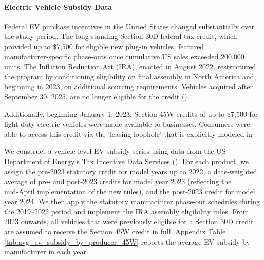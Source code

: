 \documentclass[11pt]{article}
\begin{document}
\paragraph{Electric Vehicle Subsidy Data}
Federal EV purchase incentives in the United States changed substantially over the study period. The long‑standing Section 30D federal tax credit, which provided up to \$7{,}500 for eligible new plug‑in vehicles, featured manufacturer‑specific phase‑outs once cumulative US sales exceeded 200{,}000 units. The Inflation Reduction Act (IRA), enacted in August 2022, restructured the program by conditioning eligibility on final assembly in North America and, beginning in 2023, on additional sourcing requirements. Vehicles acquired after September 30, 2025, are no longer eligible for the credit (\cite{internal_revenue_service_clean_2025}).

Additionally, beginning January 1, 2023, Section 45W credits of up to \$7,500 for light-duty electric vehicles were made available to businesses. Consumers were able to access this credit via the 'leasing loophole' that is explicitly modeled in \cite{allcott_effects_2024}.

We construct a vehicle‑level EV subsidy series using data from the US Department of Energy’s Tax Incentive Data Services (\cite{department_of_energy_tax_2025}). For each product, we assign the pre‑2023 statutory credit for model years up to 2022, a date‑weighted average of pre‑ and post‑2023 credits for model year 2023 (reflecting the mid‑April implementation of the new rules), and the post‑2023 credit for model year 2024. We then apply the statutory manufacturer phase‑out schedules during the 2019–2022 period and implement the IRA assembly eligibility rules. From 2023 onwards, all vehicles that were previously eligible for a Section 30D credit are assumed to receive the Section 45W credit in full.
Appendix Table \ref{tab:avg_ev_subsidy_by_producer_45W} reports the average EV subsidy by manufacturer in each year.
\end{document}
